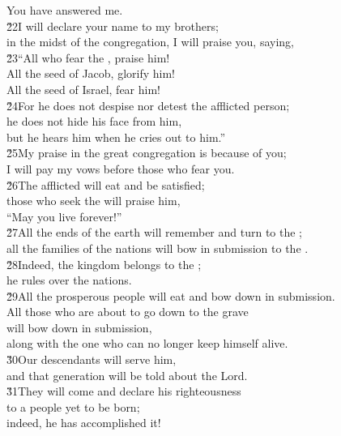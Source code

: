 \begin{poetry}
\poeml You have answered me. \\
\poeml \v{22}I will declare your name to my brothers; \\
\poemll    in the midst of the congregation, I will praise you, saying, \\
\poeml \v{23}``All who fear the , praise him! \\
\poemll    All the seed of Jacob, glorify him! \\
\poeml All the seed of Israel, fear him! \\
\poeml \v{24}For he does not despise nor detest the afflicted person; \\
\poeml he does not hide his face from him, \\
\poemll    but he hears him when he cries out to him.'' \\
\poeml \v{25}My praise in the great congregation is because of you; \\
\poemll    I will pay my vows before those who fear you. \\
\poeml \v{26}The afflicted will eat and be satisfied; \\
\poemll    those who seek the  will praise him, \\
\poemlll       ``May you live forever!'' \\
\poeml \v{27}All the ends of the earth will remember and turn to the ; \\
\poemll    all the families of the nations will bow in submission to the . \\
\poeml \v{28}Indeed, the kingdom belongs to the ; \\
\poemll    he rules over the nations. \\
\poeml \v{29}All the prosperous people will eat and bow down in submission. \\
\poemll    All those who are about to go down to the grave \\
\poemlll       will bow down in submission, \\
\poemll    along with the one who can no longer keep himself alive. \\
\poeml \v{30}Our descendants will serve him, \\
\poemll    and that generation will be told about the Lord. \\
\poeml \v{31}They will come and declare his righteousness \\
\poemll    to a people yet to be born; \\
\poemlll       indeed, he has accomplished it!
\end{poetry}

